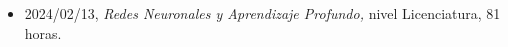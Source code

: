 \begin{itemize} 
\item 2024/02/13, \textit{ Redes Neuronales y Aprendizaje Profundo,} nivel Licenciatura, 81 horas. 
\end{itemize} 
